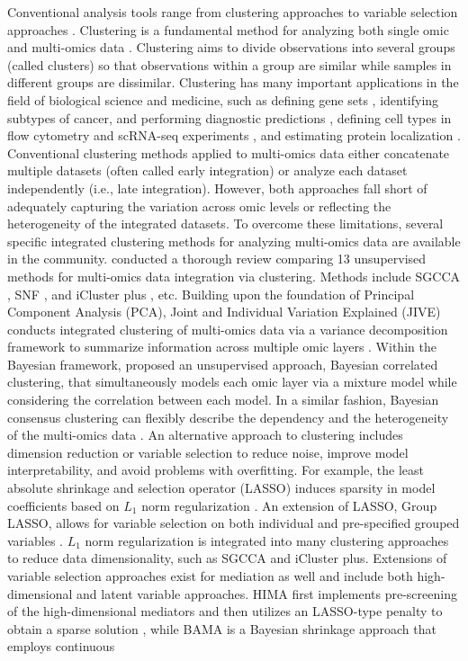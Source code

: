 Conventional analysis tools range from clustering approaches to variable selection approaches \citep{gonzalez2019omic}. Clustering is a fundamental method for analyzing both single omic and multi-omics data \citep{rappoport2018multi}. Clustering aims to divide observations into several groups (called clusters) so that observations within a group are similar while samples in different groups are dissimilar. Clustering has many important applications in the field of biological science and medicine, such as defining gene sets \citep{hejblum2015time}, identifying subtypes of cancer, and performing diagnostic predictions \citep{curtis2012genomic, khan2001classification}, defining cell types in flow cytometry and scRNA-seq experiments \citep{chan2008statistical, hejblum2019sequential, prabhakaran2016dirichlet}, and estimating protein localization \citep{crook2018bayesian}. Conventional clustering methods applied to multi-omics data either concatenate multiple datasets (often called early integration) or analyze each dataset independently (i.e., late integration). However, both approaches fall short of adequately capturing the variation across omic levels or reflecting the heterogeneity of the integrated datasets. To overcome these limitations, several specific integrated clustering methods for analyzing multi-omics data are available in the community. \citet{pierre2020clustering} conducted a thorough review comparing 13 unsupervised methods for multi-omics data integration via clustering. Methods include SGCCA \citep{tenenhaus2014variable}, SNF \citep{wang2014similarity}, and iCluster plus \citep{mo2013pattern}, etc. Building upon the foundation of Principal Component Analysis (PCA), Joint and Individual Variation Explained (JIVE) conducts integrated clustering of multi-omics data via a variance decomposition framework to summarize information across multiple omic layers \citep{lock2013joint}. Within the Bayesian framework, \citet{kirk2012bayesian} proposed an unsupervised approach, Bayesian correlated clustering, that simultaneously models each omic layer via a mixture model while considering the correlation between each model. In a similar fashion, Bayesian consensus clustering can flexibly describe the dependency and the heterogeneity of the multi-omics data \citep{lock2013bayesian}. An alternative approach to clustering includes dimension reduction or variable selection to reduce noise, improve model interpretability, and avoid problems with overfitting. For example, the least absolute shrinkage and selection operator (LASSO) induces sparsity in model coefficients based on $L_1$ norm regularization \citep{tibshirani1996regression}. An extension of LASSO, Group LASSO, allows for variable selection on both individual and pre-specified grouped variables \citep{yuan2006model}. $L_1$ norm regularization is integrated into many clustering approaches to reduce data dimensionality, such as SGCCA and iCluster plus. Extensions of variable selection approaches exist for mediation as well and include both high-dimensional and latent variable approaches. HIMA first implements pre-screening of the high-dimensional mediators and then utilizes an LASSO-type penalty to obtain a sparse solution \citep{zhang2016estimating}, while BAMA is a Bayesian shrinkage approach that employs continuous 